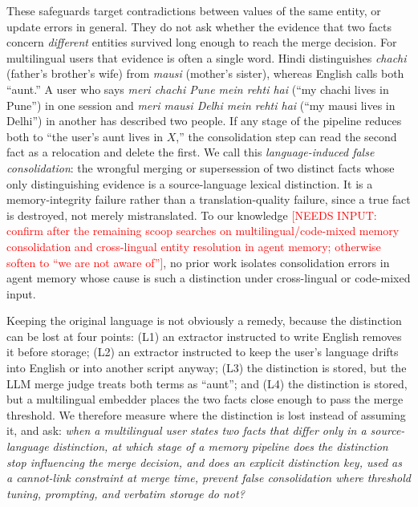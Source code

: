 \documentclass[conference]{IEEEtran}
\newcommand{\pending}[1]{\textcolor{red}{#1}}
\begin{document}
These safeguards target contradictions between values of the same entity,
or update errors in general. They do not ask whether the evidence that two
facts concern \emph{different} entities survived long enough to reach the
merge decision. For multilingual users that evidence is often a single
word. Hindi distinguishes \textit{chachi} (father's brother's wife) from
\textit{mausi} (mother's sister), whereas English calls both ``aunt.'' A
user who says \textit{meri chachi Pune mein rehti hai} (``my chachi lives
in Pune'') in one session and \textit{meri mausi Delhi mein rehti hai}
(``my mausi lives in Delhi'') in another has described two people. If any
stage of the pipeline reduces both to ``the user's aunt lives in $X$,'' the
consolidation step can read the second fact as a relocation and delete the
first. We call this \emph{language-induced false consolidation}: the
wrongful merging or supersession of two distinct facts whose only
distinguishing evidence is a source-language lexical distinction. It is a
memory-integrity failure rather than a translation-quality failure, since a
true fact is destroyed, not merely mistranslated. To our knowledge
\pending{[NEEDS INPUT: confirm after the remaining scoop searches on
multilingual/code-mixed memory consolidation and cross-lingual entity
resolution in agent memory; otherwise soften to ``we are not aware of'']},
no prior work isolates consolidation errors in agent memory whose cause is
such a distinction under cross-lingual or code-mixed input.

Keeping the original language is not obviously a remedy, because the
distinction can be lost at four points: (L1) an extractor instructed to
write English removes it before storage; (L2) an extractor instructed to
keep the user's language drifts into English or into another script
anyway; (L3) the distinction is stored, but the LLM merge judge treats both
terms as ``aunt''; and (L4) the distinction is stored, but a multilingual
embedder places the two facts close enough to pass the merge threshold. We
therefore measure where the distinction is lost instead of assuming it, and
ask: \emph{when a multilingual user states two facts that differ only in a
source-language distinction, at which stage of a memory pipeline does the
distinction stop influencing the merge decision, and does an explicit
distinction key, used as a cannot-link constraint at merge time, prevent
false consolidation where threshold tuning, prompting, and verbatim storage
do not?}
\end{document}
